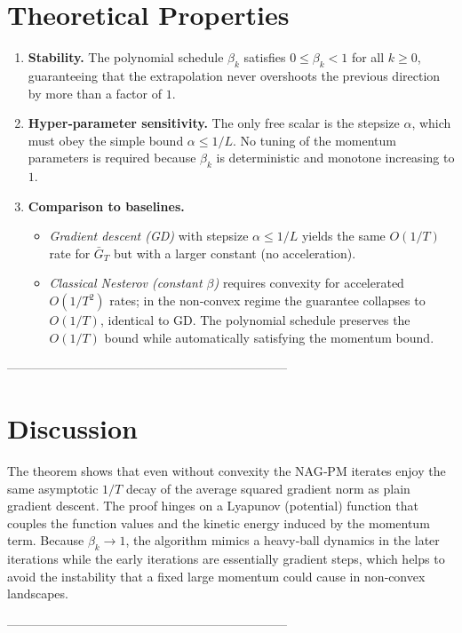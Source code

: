 \documentclass[11pt]{article}
\begin{document}
\section*{Theoretical Properties}
\begin{enumerate}
\item \textbf{Stability.} The polynomial schedule $\beta_k$ satisfies $0\le\beta_k<1$ for all $k\ge0$, guaranteeing that the extrapolation never overshoots the previous direction by more than a factor of $1$.
\item \textbf{Hyper‑parameter sensitivity.} The only free scalar is the stepsize $\alpha$, which must obey the simple bound $\alpha\le1/L$. No tuning of the momentum parameters is required because $\beta_k$ is deterministic and monotone increasing to $1$.
\item \textbf{Comparison to baselines.}
    \begin{itemize}
        \item \emph{Gradient descent (GD)} with stepsize $\alpha\le1/L$ yields the same $O(1/T)$ rate for $\bar G_T$ but with a larger constant (no acceleration).  
        \item \emph{Classical Nesterov (constant $\beta$)} requires convexity for accelerated $O(1/T^{2})$ rates; in the non‑convex regime the guarantee collapses to $O(1/T)$, identical to GD.  The polynomial schedule preserves the $O(1/T)$ bound while automatically satisfying the momentum bound.
    \end{itemize}
\end{enumerate}

--------------------------------------------------------------------

\section*{Discussion}
The theorem shows that even without convexity the NAG‑PM iterates enjoy the same
asymptotic $1/T$ decay of the average squared gradient norm as plain gradient
descent.  The proof hinges on a Lyapunov (potential) function that couples the
function values and the kinetic energy induced by the momentum term.
Because $\beta_k\to1$, the algorithm mimics a heavy‑ball dynamics in the later
iterations while the early iterations are essentially gradient steps, which
helps to avoid the instability that a fixed large momentum could cause in
non‑convex landscapes.

--------------------------------------------------------------------
\end{document}

